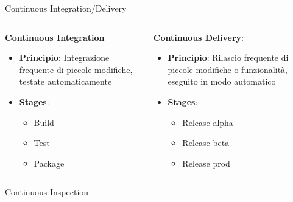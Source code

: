 \begin{frame}{Continuous Integration/Delivery}
    \begin{columns}[onlytextwidth]
        \begin{column}{0.45\textwidth}
            \textbf{Continuous Integration}
            \vspace{2mm}
            \begin{itemize}
                \item \textbf{Principio}: Integrazione frequente di piccole modifiche, testate automaticamente
                \vspace{2mm}
                \item \textbf{Stages}:
                \begin{itemize}
                    \item Build
                    \item Test
                    \item Package
                \end{itemize}
            \end{itemize}
        \end{column}
        \begin{column}{0.45\textwidth}
            \textbf{Continuous Delivery}:
            \vspace{2mm}
            \begin{itemize}
                \item \textbf{Principio}: Rilascio frequente di piccole modifiche o funzionalità, eseguito in modo automatico
                \vspace{2mm}
                \item \textbf{Stages}:
                \begin{itemize}
                    \item Release alpha
                    \item Release beta
                    \item Release prod
                \end{itemize}
            \end{itemize}
        \end{column}
    \end{columns}
\end{frame}

\begin{frame}{Continuous Inspection}
    
\end{frame}